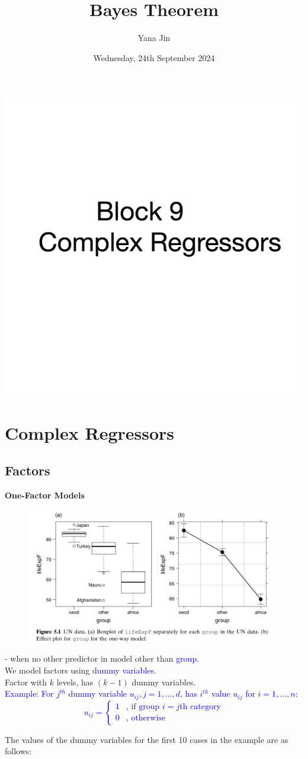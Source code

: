 \documentclass[14pt]{extarticle}
\title{Bayes Theorem}
\author{Yana Jin}
\date{Wednesday, 24th September 2024}
\newcommand{\coverpage}{%
    \begin{titlepage}
        \centering
        \includegraphics[width=1\textwidth]{cover.png}
    \end{titlepage}
}
\begin{document}
\coverpage

\section*{Complex Regressors}

\subsection*{Factors}

\noindent
\textbf{One-Factor Models}
\begin{figure}[H]
    \centering
    \includegraphics[width=1\textwidth]{fig1.png}
\end{figure}
- when no other predictor in model other than \textcolor{blue}{group}.\\
We model factors using \textcolor{blue}{dummy variables}.\\
Factor with \(k\) levels, has $(k - 1)$ dummy variables.\\
\textcolor{blue}{Example: For $j^{th}$ dummy variable $u_{ij}, j=1,\dots,d$, has $i^{th}$ value $u_{ij}$ for $i = 1, \dots, n$:
\[
u_{ij} = 
\begin{cases} 
1 & \text{, if group } i = j\text{th category} \\
0 & \text{, otherwise}
\end{cases}
\]}

\newpage

\noindent
The values of the dummy variables for the first 10 cases in the example are as follows:\vspace{0.2cm}
\end{document}
